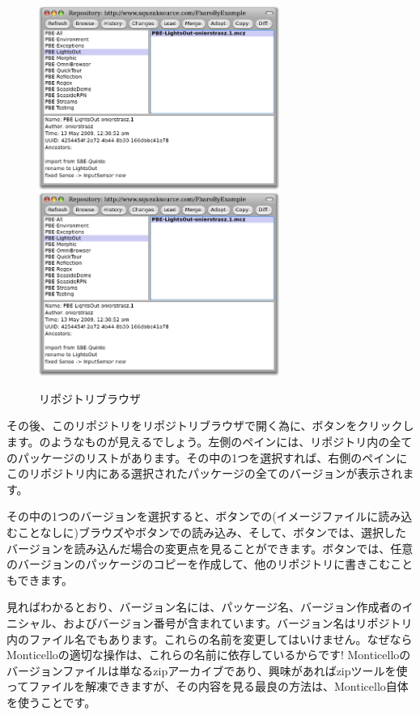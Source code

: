 \documentclass[a4paper,10pt,twoside]{book}
\begin{document}
\begin{figure}[btp]
\begin{center}
\ifluluelse
{\includegraphics[width=0.7\textwidth]{SqueakSource-PBE}}
{\includegraphics[width=0.7\textwidth]{SqueakSource-PBE}}
\end{center}
\caption{リポジトリブラウザ}
\end{figure}
\noindent
その後、このリポジトリをリポジトリブラウザで開く為に、ボタンをクリックします。のようなものが見えるでしょう。左側のペインには、リポジトリ内の全てのパッケージのリストがあります。その中の1つを選択すれば、右側のペインにこのリポジトリ内にある選択されたパッケージの全てのバージョンが表示されます。

その中の1つのバージョンを選択すると、ボタンでの(イメージファイルに読み込むことなしに)ブラウズやボタンでの読み込み、そして、ボタンでは、選択したバージョンを読み込んだ場合の変更点を見ることができます。ボタンでは、任意のバージョンのパッケージのコピーを作成して、他のリポジトリに書きこむこともできます。

見ればわかるとおり、バージョン名には、パッケージ名、バージョン作成者のイニシャル、およびバージョン番号が含まれています。バージョン名はリポジトリ内のファイル名でもあります。これらの名前を変更してはいけません。なぜならMonticelloの適切な操作は、これらの名前に依存しているからです! Monticelloのバージョンファイルは単なるzipアーカイブであり、興味があればzipツールを使ってファイルを解凍できますが、その内容を見る最良の方法は、Monticello自体を使うことです。
\end{document}

